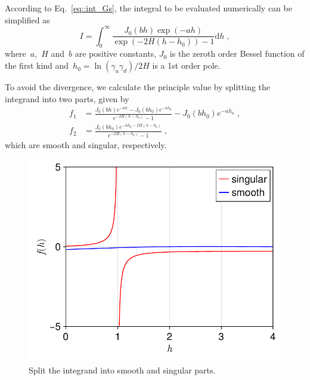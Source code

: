 According to Eq.~\eqref{eq::int_Gs}, the integral to be evaluated numerically can be simplified as
\begin{equation}
    I = \int_0^{\infty} \frac{J_0(b h) \exp{(- a h)}}{\exp{( - 2 H (h - h_0))} - 1} \mathrm{d}h\;,
\end{equation}
where~$a$,~$H$ and~$b$ are positive constants, $J_0$ is the zeroth order Bessel function of the first kind and~$h_0 = {\ln{(\gamma_u \gamma_d)}} / {2H}$ is a 1st order pole.

To avoid the divergence, we calculate the principle value by splitting the integrand into two parts, given by
\begin{equation}
    \begin{split}
        f_{1} &=  \frac{J_0(b h) e^{- a h} - J_0(b h_0) e^{- a h_0}}{e^{- 2 H (h - h_0)} - 1} - J_0(b h_0) e^{- a h_0} \;, \\
        f_{2} &= \frac{J_0(b h_0) e^{- a h_0 - 2 H (h - h_0)}}{e^{- 2 H (h - h_0)} - 1} \;,
    \end{split}
\end{equation}
which are smooth and singular, respectively.

\begin{figure}[ht]
    \centering
    \includegraphics[width = 0.5\linewidth]{figs/fi.pdf}
    \caption{Split the integrand into smooth and singular parts.}
    \label{fig:split}
\end{figure}

